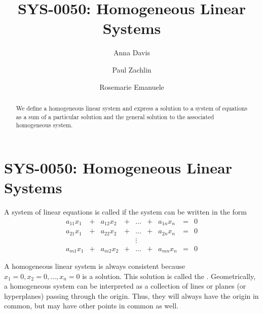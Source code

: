 \documentclass{ximera}
\author{Anna Davis \and Paul Zachlin \and Rosemarie Emanuele} \title{SYS-0050:  Homogeneous Linear Systems} \license{CC-BY 4.0}
\begin{document}
\begin{abstract}
  We define a homogeneous linear system and express a solution to a system of equations as a sum of a particular solution and the general solution to the associated homogeneous system.
  \end{abstract}
\maketitle



\section*{SYS-0050:  Homogeneous Linear Systems}

\begin{definition}\label{def:homogeneous}
A system of linear equations is called  if the system can be written in the form
$$\begin{array}{ccccccccc}
      a_{11}x_1 &+ &a_{12}x_2&+&\ldots&+&a_{1n}x_n&= &0 \\
	 a_{21}x_1 &+ &a_{22}x_2&+&\ldots&+&a_{2n}x_n&= &0 \\
     &&&&\vdots&&&& \\
     a_{m1}x_1 &+ &a_{m2}x_2&+&\ldots&+&a_{mn}x_n&= &0
    \end{array}$$
\end{definition}

A homogeneous linear system is always consistent because $x_1=0, x_2=0, \ldots ,x_n=0$ is a solution.  This solution is called the .  Geometrically, a homogeneous system can be interpreted as a collection of lines or planes (or hyperplanes) passing through the origin.  Thus, they will always have the origin in common, but may have other points in common as well.
\end{document}
